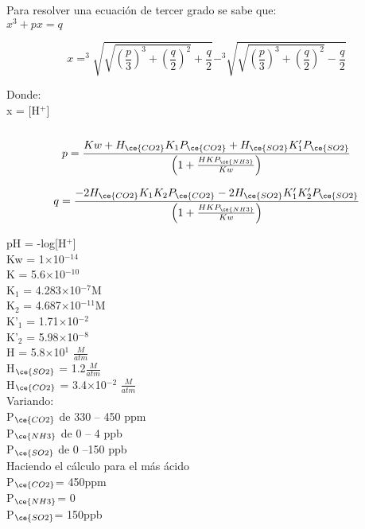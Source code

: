 Para resolver una ecuaci\'on de tercer grado se sabe que:\\

$x^3 + px = q$

\begin{equation*}
x = ^3\sqrt{\sqrt{\left(\frac{p}{3}\right)^3 + \left(\frac{q}{2}\right)^2}
 + \frac{q}{2}}  -  ^3\sqrt{\sqrt{ \left(\frac{p}{3}\right)^3 + \left(\frac{q}{2}\right)^2} - \frac{q}{2}}
\end{equation*}

Donde:\\
x = [H$^+$]\\\\
\begin{equation*}
p =\frac{Kw + H_{\ce{CO2}} K_1 P_{\ce{CO2}} + H_{\ce{SO2}}K'_1 P_{\ce{SO2}}}{\left( 1 + \frac{HKP_{\ce{NH3}}}{Kw}\right)}
\end{equation*}

\begin{equation*}
q =\frac{-2 H_{\ce{CO2}}K_1K_2P_{\ce{CO2}} -2H_{\ce{SO2}}K'_1K'_2P_{\ce{SO2}}}{\left( 1 + \frac{HKP_{\ce{NH3}}}{Kw}\right)}
\end{equation*}

pH = -log[H$^+$]\\
Kw = 1$\times$10$^{-14}$\\
K = 5.6$\times$10$^{-10}$\\
K$_1$ = 4.283$\times$10$^{-7}$M\\
K$_2$ = 4.687$\times$10$^{-11}$M\\
K'$_1$ = 1.71$\times$10$^{-2}$\\
K'$_2$ = 5.98$\times$10$^{-8}$\\
H = 5.8$\times$10$^{1}$ $\frac{M}{atm}$\\
H$_{\ce{SO2}}$ = 1.2$\frac{M}{atm}$\\
H$_{\ce{CO2}}$ = 3.4$\times$10$^{-2}$ $\frac{M}{atm}$\\

Variando:\\ 
P$_{\ce{CO2}}$ de 330 -- 450 ppm\\
P$_{\ce{NH3}}$ de 0 -- 4 ppb \\
P$_{\ce{SO2}}$ de 0 --150 ppb\\

Haciendo el c\'alculo para el m\'as \'acido\\
P$_{\ce{CO2}}$= 450ppm\\
P$_{\ce{NH3}}$= 0\\
P$_{\ce{SO2}}$= 150ppb\\

